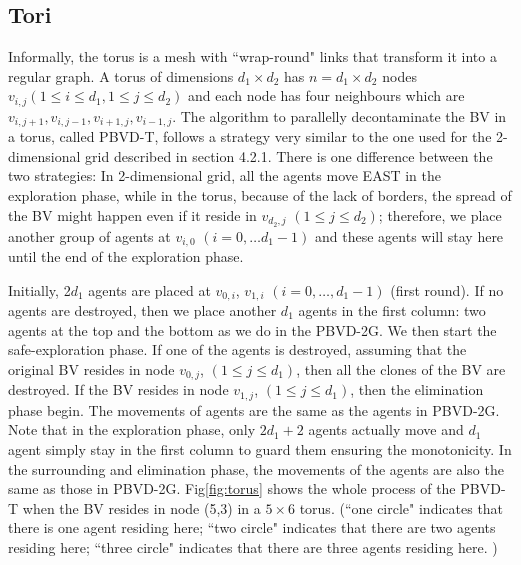 \subsection{Tori}
Informally, the torus is a mesh with ``wrap-round" links that transform it into a regular graph. A torus of dimensions $d_1\times d_2$ has $n=d_1\times d_2$ nodes $v_{i,j} (1\leq i\leq d_1, 1\leq j\leq d_2)$ and each node has four neighbours which are $v_{i,j+1}, v_{i,j-1}, v_{i+1,j}, v_{i-1,j}$. The algorithm to parallelly decontaminate the BV in a torus, called PBVD-T, follows a strategy very similar to the one used for the 2-dimensional grid described in section 4.2.1. There is one difference between the two strategies: In 2-dimensional grid, all the agents move EAST in the exploration phase, while in the torus, because of the lack of borders, the spread of the BV might happen even if it reside in $v_{d_2, j}$ $(1\leq j\leq d_2)$; therefore, we place another group of agents at $v_{i,0}$ $(i=0,\ldots d_1-1)$ and these agents will stay here until the end of the  exploration phase. 

Initially, 2$d_1$ agents are placed at $v_{0,i}$, $v_{1,i}$ $(i=0,\ldots,d_1-1)$ (first round). If no agents are destroyed, then we place another $d_1$ agents in the first column: two agents at the top and the bottom  as we do in the PBVD-2G. We then start the safe-exploration phase. If one of the agents is destroyed, assuming that the original BV resides in node $v_{0,j}$, $(1\leq j\leq d_1)$, then all the clones of the BV are destroyed. If the BV resides in node $v_{1,j}$, $(1\leq j\leq d_1)$, then the elimination phase begin. The movements of agents are the same as the agents in PBVD-2G. Note that in the exploration phase, only $2d_1+2$ agents actually move and $d_1$ agent simply stay in the first column to guard them ensuring the  monotonicity. In the surrounding and elimination phase, the movements of the agents are also the same as those in PBVD-2G. Fig\ref{fig:torus} shows the whole process of the PBVD-T when the BV resides in node (5,3) in a $5\times6$ torus. (``one circle" indicates that there is one agent residing here; ``two circle" indicates that there are two agents residing here; ``three circle" indicates that there are three agents residing here. )

